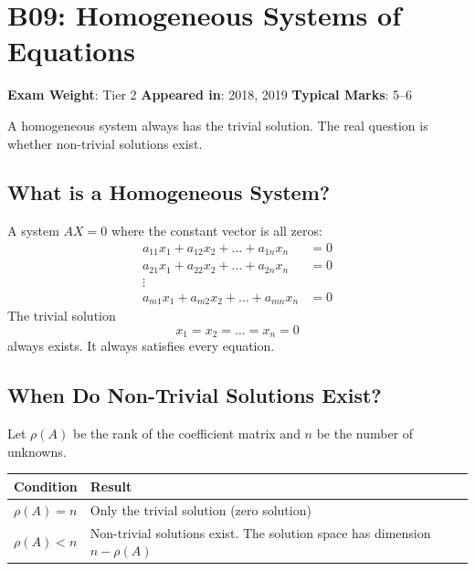 \documentclass[
]{article}
\renewenvironment{quote}
  {\begin{tcolorbox}[
     colback=calloutbg,
     colframe=calloutframe,
     colupper=callouttext,
     arc=3pt,
     boxrule=0.5pt,
     leftrule=0.5pt,
     borderline west={3pt}{0pt}{calloutaccent},
     left=8pt,
     right=8pt,
     top=6pt,
     bottom=6pt
   ]}
  {\end{tcolorbox}}
\begin{document}
\section{B09: Homogeneous Systems of
Equations}\label{b09-homogeneous-systems-of-equations}

\begin{quote}
\textbf{Exam Weight}: Tier 2 \textbar{} \textbf{Appeared in}: 2018, 2019
\textbar{} \textbf{Typical Marks}: 5--6
\end{quote}

A homogeneous system always has the trivial solution. The real question
is whether non-trivial solutions exist.

\subsection{What is a Homogeneous
System?}\label{what-is-a-homogeneous-system}

A system \(AX = 0\) where the constant vector is all zeros:
\[
\begin{aligned}
a_{11}x_1 + a_{12}x_2 + \dots + a_{1n}x_n &= 0 \\
a_{21}x_1 + a_{22}x_2 + \dots + a_{2n}x_n &= 0 \\
\vdots \\
a_{m1}x_1 + a_{m2}x_2 + \dots + a_{mn}x_n &= 0
\end{aligned}
\]
The trivial solution
\[
x_1 = x_2 = \dots = x_n = 0
\]
always exists. It always satisfies every equation.

\subsection{When Do Non-Trivial Solutions
Exist?}\label{when-do-non-trivial-solutions-exist}

Let \(\rho(A)\) be the rank of the coefficient matrix and \(n\) be the
number of unknowns.

\begin{longtable}[]{@{}
  >{\raggedright\arraybackslash}p{}
  >{\raggedright\arraybackslash}p{}@{}}
\toprule\noalign{}
\begin{minipage}[b]{\linewidth}\raggedright
Condition
\end{minipage} & \begin{minipage}[b]{\linewidth}\raggedright
Result
\end{minipage} \\
\midrule\noalign{}
\endhead
\bottomrule\noalign{}
\endlastfoot
\(\rho(A) = n\) & Only the trivial solution (zero solution) \\
\(\rho(A) < n\) & Non-trivial solutions exist. The solution space has
dimension \(n - \rho(A)\) \\
\end{longtable}
\end{document}
